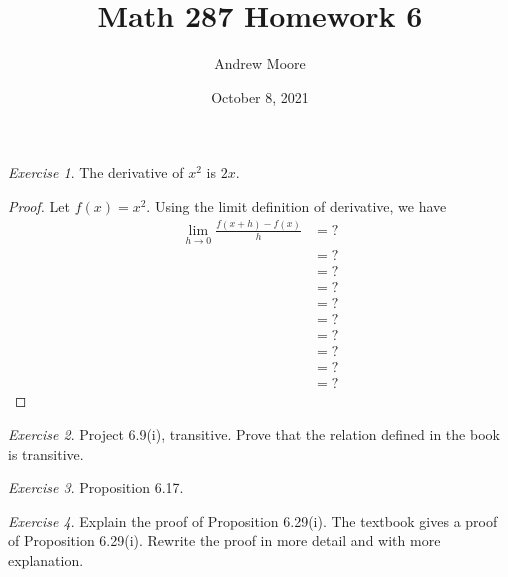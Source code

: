 \documentclass[12pt,oneside]{amsart}
\title{Math 287 Homework 6}
\author{Andrew Moore}
\date{October 8, 2021} %
\theoremstyle{remark}
\newtheorem{exer}{Exercise}
\begin{document}
\maketitle

%
%
%
%
\newpage
\begin{exer}
The derivative of $x^2$ is $2x$.
\end{exer}
\begin{proof}
Let $f(x) = x^2$.
Using the limit definition of derivative, we have
\begin{equation}
\begin{split}
  \lim_{h \to 0} \frac{f(x+h) - f(x)}{h} &= ? \\
    &= ? \\
    &= ? \\
    &= ? \\
    &= ? \\
    &= ? \\
    &= ? \\
    &= ? \\
    &= ? \\
    &= ?
\end{split}
\end{equation}
\end{proof}

%
%
%
%
\newpage
\begin{exer}
Project 6.9(i), transitive. Prove that the relation defined in the book is transitive.
%
%
%
\end{exer}

%
%
%
%
\newpage
\begin{exer}
Proposition 6.17.
\end{exer}

%
%
%
%
\newpage
\begin{exer}
Explain the proof of Proposition 6.29(i). The textbook gives a proof of Proposition 6.29(i). Rewrite the proof in more detail and with more explanation.
\end{exer}
\end{document}
